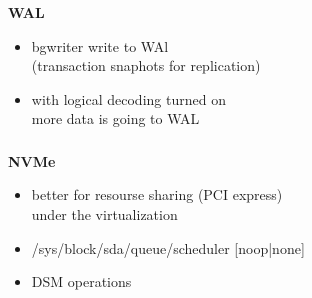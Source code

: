 \documentclass[usenames,dvipsnames, 18pt, compress, aspectratio=169]{beamer}
\begin{document}
\begin{frame}
\begin{center}
{
        }

    \end{center}
\end{frame}

\begin{frame}
    \frametitle{}
    \begin{center}
    \textbf{WAL}

        \begin{itemize}[label={\MVRightarrow}]
            \item bgwriter write to WAl \\
                (transaction snaphots for replication)
            \item with logical decoding turned on \\
                more data is going to WAL
        \end{itemize}

    \end{center}
\end{frame}

\begin{frame}
    \frametitle{}
    \begin{center}
    \textbf{NVMe}

        \begin{itemize}[label={\MVRightarrow}]
            \item better for resourse sharing (PCI express) \\
                under the virtualization
            \item /sys/block/sda/queue/scheduler [noop|none]
            \item DSM operations
        \end{itemize}

    \end{center}
\end{frame}
\end{document}
